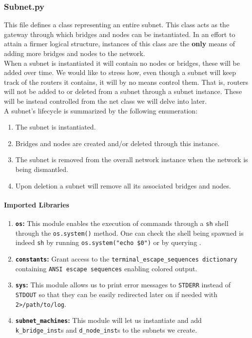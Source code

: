 \subsubsection{Subnet.py}
    This file defines a class representing an entire subnet. This class acts as the gateway through which bridges and nodes can be instantiated. In an effort to attain a firmer logical structure, instances of this class are the \textbf{only} means of adding more bridges and nodes to the network.\\

    When a subnet is instantiated it will contain no nodes or bridges, these will be added over time. We would like to stress how, even though a subnet will keep track of the routers it contains, it will by no means control them. That is, routers will not be added to or deleted from a subnet through a subnet instance. These will be instead controlled from the net class we will delve into later.\\

    A subnet's lifecycle is summarized by the following enumeration:\\

    \begin{enumerate}
        \item The subnet is instantiated.
        \item Bridges and nodes are created and/or deleted through this instance.
        \item The subnet is removed from the overall network instance when the network is being dismantled.
        \item Upon deletion a subnet will remove all its associated bridges and nodes.
    \end{enumerate}

    \paragraph{Imported Libraries}
        \begin{enumerate}
            \item \textbf{\texttt{os}:} This module enables the execution of commands through a \texttt{sh} shell through the \texttt{os.system()} method. One can check the shell being spawned is indeed \texttt{sh} by running \texttt{\allowbreak os.system("echo \$0")} or by querying \cite{bib:man-system}.
            \item \textbf{\texttt{constants}:} Grant access to the \texttt{\allowbreak terminal\_escape\_sequences dictionary} containing \texttt{ANSI escape sequences} enabling colored output.
            \item \textbf{\texttt{sys}:} This module allows us to print error messages to \texttt{STDERR} instead of \texttt{STDOUT} so that they can be easily redirected later on if needed with \texttt{2>/path/to/log}.
            \item \textbf{\texttt{subnet\_machines}:} This module will let us instantiate and add \texttt{k\_bridge\_inst}s and \texttt{d\_node\_inst}s to the subnets we create.
        \end{enumerate}

